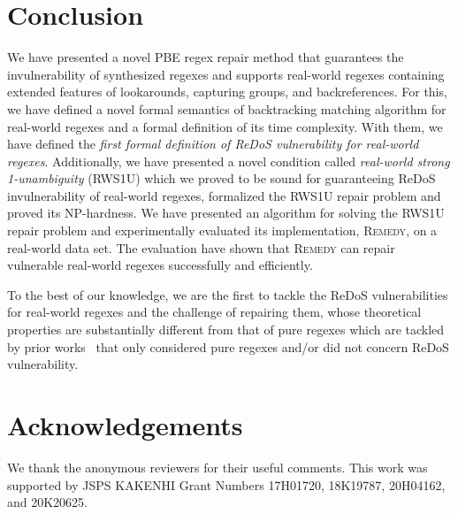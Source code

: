 \documentclass[conference]{IEEEtran}
\newcommand{\tool}{\textsc{Remedy}}
\newcommand{\ltp}{RWS1U}
\begin{document}
\section{Conclusion}



We have presented a novel PBE regex repair method that guarantees the invulnerability of synthesized regexes and supports real-world regexes containing extended features of lookarounds, capturing groups, and backreferences.  For this, we have defined
a novel formal semantics of backtracking matching algorithm for real-world regexes and a formal definition of its time complexity.
With them, we have defined the {\em first formal definition of ReDoS vulnerability for real-world regexes}.  Additionally, we have presented a novel condition called {\em real-world strong 1-unambiguity} (\ltp{}) which we proved to be sound for guaranteeing ReDoS invulnerability of real-world regexes, formalized the \ltp{} repair problem and proved its NP-hardness.  We have presented an algorithm for solving the \ltp{} repair problem and experimentally evaluated its implementation, \tool{}, on a real-world data set.  The evaluation have shown that \tool{} can repair vulnerable real-world regexes successfully and efficiently.

To the best of our knowledge, we are the first to tackle the ReDoS vulnerabilities for real-world regexes and the challenge of repairing them, whose theoretical properties are substantially different from that of pure regexes which are tackled by prior works~\cite{Alquezar94incrementalgrammatical,10.1145/3093335.2993244, 6994453, 7374717, 10.1145/3360565, DBLP:journals/corr/abs-1908-03316, FlashRegex,10.1145/3129416.3129440,10.1145/3071178.3071196} that only considered pure regexes and/or did not concern ReDoS vulnerability.


 
\section*{Acknowledgements}
We thank the anonymous reviewers for their useful comments.
This work was supported by JSPS KAKENHI Grant Numbers 17H01720, 18K19787, 	20H04162, and 20K20625.






\appendices
\end{document}
